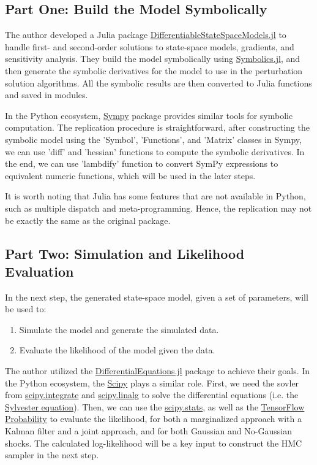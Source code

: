\documentclass[12pt]{article}
\begin{document}
\subsection*{Part One: Build the Model Symbolically}

The author developed a Julia package \href{https://github.com/HighDimensionalEconLab/DifferentiableStateSpaceModels.jl}{DifferentiableStateSpaceModels.jl} to handle first- and second-order solutions to state-space models, gradients, and sensitivity analysis. They build the model symbolically using \href{https://github.com/JuliaSymbolics/Symbolics.jl}{Symbolics.jl}, and then generate the symbolic derivatives for the model to use in the perturbation solution algorithms. All the symbolic results are then converted to Julia functions and saved in modules.

In the Python ecosystem, \href{https://www.sympy.org/}{Sympy} package provides similar tools for symbolic computation. The replication procedure is straightforward, after constructing the symbolic model using the 'Symbol', 'Functions', and 'Matrix' classes in Sympy, we can use 'diff' and 'hessian' functions to compute the symbolic derivatives. In the end, we can use 'lambdify' function to convert SymPy expressions to equivalent numeric functions, which will be used in the later steps.

It is worth noting that Julia has some features that are not available in Python, such as multiple dispatch and meta-programming. Hence, the replication may not be exactly the same as the original package.

\subsection*{Part Two: Simulation and Likelihood Evaluation}
In the next step, the generated state-space model, given a set of parameters, will be used to:
\begin{enumerate}
    \item Simulate the model and generate the simulated data.
    \item Evaluate the likelihood of the model given the data.
\end{enumerate}

The author utilized the \href{https://github.com/SciML/DifferenceEquations.jl}{DifferentialEquations.jl} package to achieve their goals. In the Python ecosystem, the \href{https://scipy.org/}{Scipy} plays a similar role. First, we need the sovler from \href{https://docs.scipy.org/doc/scipy/reference/integrate.html#}{scipy.integrate} and \href{https://docs.scipy.org/doc/scipy/reference/linalg.html}{scipy.linalg} to solve the differential equations (i.e. the \href{https://docs.scipy.org/doc/scipy/reference/generated/scipy.linalg.solve_sylvester.html}{Sylvester equation}). Then, we can use the \href{https://docs.scipy.org/doc/scipy/reference/stats.html}{scipy.stats}, as well as the \href{https://www.tensorflow.org/probability}{TensorFlow Probability} to evaluate the likelihood, for both a marginalized approach with a Kalman filter and a joint approach, and for both Gaussian and No-Gaussian shocks. The calculated log-likelihood will be a key input to construct the HMC sampler in the next step.
\end{document}
